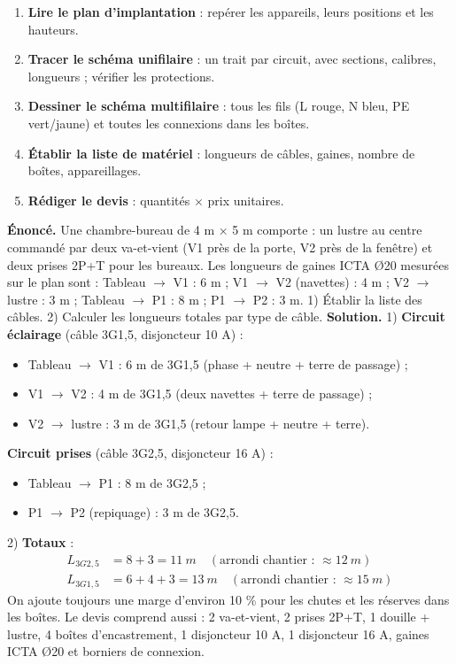 \documentclass[11pt]{article}
\newcounter{popsec}
\newcounter{popsub}
\newcommand{\courssub}[1]{%
  \stepcounter{popsub}%
  \par\vspace{9pt}\noindent{\popxbold\fontsize{11.5}{13}\selectfont\color{popink}{\color{poporange}\thepopsec.\thepopsub}\hspace{6pt}#1}\par\nopagebreak\vspace{4pt}
}
\begin{document}
\courssub{Mise en situation : du plan au devis}

\begin{methode}
\begin{enumerate}
\item \textbf{Lire le plan d'implantation} : repérer les appareils, leurs positions et les hauteurs.
\item \textbf{Tracer le schéma unifilaire} : un trait par circuit, avec sections, calibres, longueurs ; vérifier les protections.
\item \textbf{Dessiner le schéma multifilaire} : tous les fils (L rouge, N bleu, PE vert/jaune) et toutes les connexions dans les boîtes.
\item \textbf{Établir la liste de matériel} : longueurs de câbles, gaines, nombre de boîtes, appareillages.
\item \textbf{Rédiger le devis} : quantités $\times$ prix unitaires.
\end{enumerate}
\end{methode}

\begin{exoresolu}
\textbf{Énoncé.} Une chambre-bureau de 4 m $\times$ 5 m comporte : un lustre au centre commandé par deux va-et-vient (V1 près de la porte, V2 près de la fenêtre) et deux prises 2P+T pour les bureaux. Les longueurs de gaines ICTA Ø20 mesurées sur le plan sont : Tableau $\to$ V1 : 6 m ; V1 $\to$ V2 (navettes) : 4 m ; V2 $\to$ lustre : 3 m ; Tableau $\to$ P1 : 8 m ; P1 $\to$ P2 : 3 m. 1) Établir la liste des câbles. 2) Calculer les longueurs totales par type de câble.
\tcblower
\textbf{Solution.}
1) \textbf{Circuit éclairage} (câble 3G1,5, disjoncteur 10 A) :
\begin{itemize}
\item Tableau $\to$ V1 : 6 m de 3G1,5 (phase + neutre + terre de passage) ;
\item V1 $\to$ V2 : 4 m de 3G1,5 (deux navettes + terre de passage) ;
\item V2 $\to$ lustre : 3 m de 3G1,5 (retour lampe + neutre + terre).
\end{itemize}
\textbf{Circuit prises} (câble 3G2,5, disjoncteur 16 A) :
\begin{itemize}
\item Tableau $\to$ P1 : 8 m de 3G2,5 ;
\item P1 $\to$ P2 (repiquage) : 3 m de 3G2,5.
\end{itemize}
2) \textbf{Totaux} :
\begin{align*}
L_{3G2,5} &= 8 + 3 = \SI{11}{m} \quad (\text{arrondi chantier : } \approx \SI{12}{m})\\
L_{3G1,5} &= 6 + 4 + 3 = \SI{13}{m} \quad (\text{arrondi chantier : } \approx \SI{15}{m})
\end{align*}
On ajoute toujours une marge d'environ 10 \% pour les chutes et les réserves dans les boîtes. Le devis comprend aussi : 2 va-et-vient, 2 prises 2P+T, 1 douille + lustre, 4 boîtes d'encastrement, 1 disjoncteur 10 A, 1 disjoncteur 16 A, gaines ICTA Ø20 et borniers de connexion.
\end{exoresolu}
\end{document}

